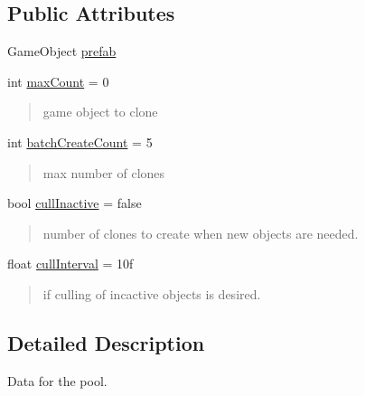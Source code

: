 \subsection*{Public Attributes}
\begin{DoxyCompactItemize}
\item 
Game\-Object \hyperlink{class_darkhexxa_1_1_simple_pool_1_1_simple_pool_1_1_pool_data_afeeca245f87b8bef8c5a954c7b78011c}{prefab}
\item 
int \hyperlink{class_darkhexxa_1_1_simple_pool_1_1_simple_pool_1_1_pool_data_ae2d66b8c6f3d77721c5ca3474cac1311}{max\-Count} = 0
\begin{DoxyCompactList}\small\item\em \begin{quotation}
game object to clone \end{quotation}
\end{DoxyCompactList}\item 
int \hyperlink{class_darkhexxa_1_1_simple_pool_1_1_simple_pool_1_1_pool_data_a7277e7f63a6189198b789f74db585a94}{batch\-Create\-Count} = 5
\begin{DoxyCompactList}\small\item\em \begin{quotation}
max number of clones \end{quotation}
\end{DoxyCompactList}\item 
bool \hyperlink{class_darkhexxa_1_1_simple_pool_1_1_simple_pool_1_1_pool_data_a19c48ea469a33d4188a996482939d665}{cull\-Inactive} = false
\begin{DoxyCompactList}\small\item\em \begin{quotation}
number of clones to create when new objects are needed. \end{quotation}
\end{DoxyCompactList}\item 
float \hyperlink{class_darkhexxa_1_1_simple_pool_1_1_simple_pool_1_1_pool_data_abf0fe104db5c39105f7c88dca1581bc1}{cull\-Interval} = 10f
\begin{DoxyCompactList}\small\item\em \begin{quotation}
if culling of incactive objects is desired. \end{quotation}
\end{DoxyCompactList}\end{DoxyCompactItemize}


\subsection{Detailed Description}
Data for the pool. 

